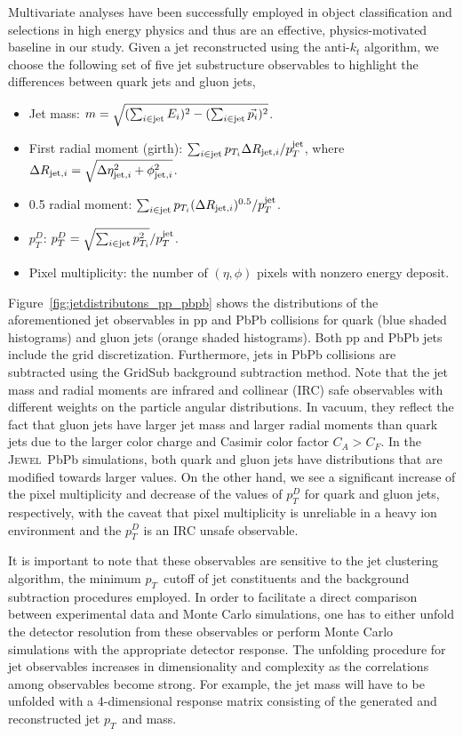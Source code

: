 \documentclass[notoc,preprintnumbers]{JHEP3}
\newcommand{\pt}{$p_{T}$}
\newcommand{\jw}{\textsc{Jewel}~}
\begin{document}
Multivariate analyses have been successfully employed in object classification and selections in high energy physics \cite{Bhat:2010zz, 1742-6596-608-1-012058} and thus are an effective, physics-motivated baseline in our study. Given a jet reconstructed using the anti-$k_{t}$ algorithm, we choose the following set of five jet substructure observables \cite{Gallicchio:2012ez} to highlight the differences between quark jets and gluon jets,
	\begin{itemize}
		\item Jet mass: $m = \sqrt{(\sum_{i\in {\rm jet}} E_i)^{2} - (\sum_{i\in {\rm jet}} \vec{p_i})^2}$.
	        \item First radial moment (girth): $\sum_{i \in {\rm jet}} p_{T_i} \Delta R_{{\rm jet}, i}/p^{\rm jet}_{T}$, where $\Delta R_{{\rm jet}, i}=\sqrt{\Delta \eta^2_{{\rm jet}, i}+\phi^2_{{\rm jet}, i}}$.
		\item 0.5 radial moment:  $\sum_{i \in {\rm jet}} p_{T_i} (\Delta R_{{\rm jet}, i})^{0.5}/p^{\rm jet}_{T}$.
        		\item $p_{T}^{D}$: $p^{D}_{T} = \sqrt{\sum_{i \in {\rm jet}} {p^2_{T_i}}}/p^{\rm jet}_{T}$.
       		\item Pixel multiplicity: the number of $(\eta,\phi)$ pixels with nonzero energy deposit.
	\end{itemize}

Figure~\ref{fig:jetdistributons_pp_pbpb} shows the distributions of the aforementioned jet observables in pp and PbPb collisions for quark (blue shaded histograms) and gluon jets (orange shaded histograms). Both pp and PbPb jets include the grid discretization. Furthermore, jets in PbPb collisions are subtracted using the GridSub background subtraction method. Note that the jet mass and radial moments are infrared and collinear (IRC) safe observables with different weights on the particle angular distributions. In vacuum, they reflect the fact that gluon jets have larger jet mass and larger radial moments than quark jets due to the larger color charge and Casimir color factor $C_A>C_F$. In the \jw PbPb simulations, both quark and gluon jets have distributions that are modified towards larger values. On the other hand, we see a significant increase of the pixel multiplicity and decrease of the values of $p_T^D$ for quark and gluon jets, respectively, with the caveat that pixel multiplicity is unreliable in a heavy ion environment and the $p_T^D$ is an IRC unsafe observable.

It is important to note that these observables are sensitive to the jet clustering algorithm, the minimum \pt ~cutoff of jet constituents and the background subtraction procedures employed. In order to facilitate a direct comparison between experimental data and Monte Carlo simulations, one has to either unfold the detector resolution from these observables or perform Monte Carlo simulations with the appropriate detector response. The unfolding procedure for jet observables increases in dimensionality and complexity as the correlations among observables become strong. For example, the jet mass will have to be unfolded with a 4-dimensional response matrix consisting of the generated and reconstructed jet \pt ~and mass.
\end{document}
